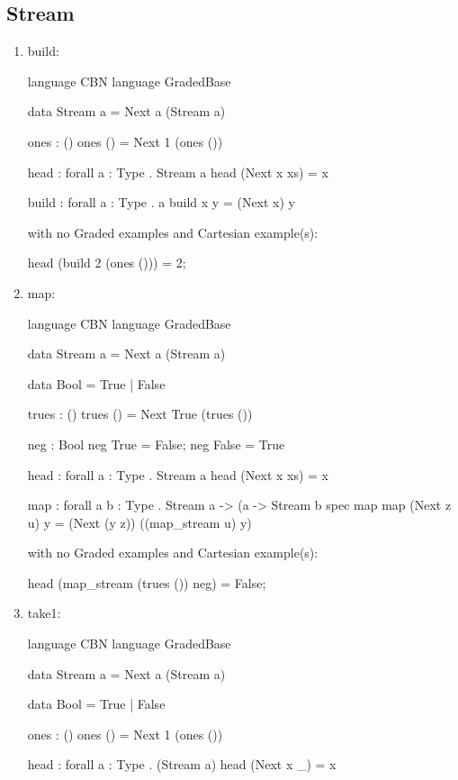 \subsection{Stream}
\begin{enumerate}
\item build: 
\begin{granule}
language CBN 
language GradedBase

data Stream a = Next a (Stream a) 

ones : () %
ones () = Next 1 (ones ())

head : forall { a : Type } . Stream a %
head (Next x xs) = x

build : forall { a : Type } . a %
build x y = (Next x) y
\end{granule}
with no Graded examples and Cartesian example(s):
\begin{granule}
head (build 2 (ones ())) = 2;
\end{granule}
\item map: 
\begin{granule}
language CBN
language GradedBase 

data Stream a = Next a (Stream a) 

data Bool = True | False

trues : () %
trues () = Next True (trues ())

neg : Bool %
neg True = False; 
neg False = True

head : forall { a : Type } . Stream a %
head (Next x xs) = x

map : forall { a b : Type }
    . Stream a %
    -> (a %
    -> Stream b
spec 
    map %
map (Next z u) y = (Next (y z)) ((map_stream u) y)
\end{granule}
with no Graded examples and Cartesian example(s):
\begin{granule}
head (map_stream (trues ()) neg) = False;
\end{granule}
\item take1: 
\begin{granule}
language CBN 
language GradedBase 
    
data Stream a = Next a (Stream a) 

data Bool = True | False
    
ones : () %
ones () = Next 1 (ones ())
    
head : forall { a : Type } . (Stream a) %
head (Next x _) = x
    

\end{granule}
\end{enumerate}
